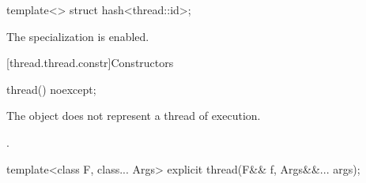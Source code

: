 %
\begin{itemdecl}
template<> struct hash<thread::id>;
\end{itemdecl}

\begin{itemdescr}
\pnum
The specialization is enabled.
\end{itemdescr}

[thread.thread.constr]{Constructors}

%
\begin{itemdecl}
thread() noexcept;
\end{itemdecl}

\begin{itemdescr}
\pnum
\effects
The object does not represent a thread of execution.

\pnum
\ensures
{}.
\end{itemdescr}

%
\begin{itemdecl}
template<class F, class... Args> explicit thread(F&& f, Args&&... args);
\end{itemdecl}

